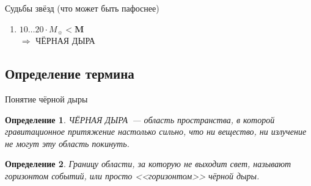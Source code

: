 \documentclass[usenames,dvipsnames,pdftex,unicode,hidelinks]{beamer}
\newtheorem{ru-def}{Определение}
\renewenvironment{definition}{\begin{ru-def}}{\end{ru-def}}
\begin{document}
\begin{frame}{Судьбы звёзд \small (что может быть пафоснее)}
\begin{enumerate}
\begin{center}
        \end{center}
      \item<3-> $10 \dots 20 \cdot M_{\sun} < \boldsymbol{M} $\\
        $\Rightarrow$ ЧЁРНАЯ ДЫРА
        \begin{center}
        \end{center}
    \end{enumerate}
  \end{frame}

  \subsection{Определение термина}

  \begin{frame}{Понятие чёрной дыры}
    \begin{definition}
      \alert{ЧЁРНАЯ ДЫРА}~--- область пространства, в которой гравитационное притяжение настолько
      сильно, что ни вещество, ни излучение не могут эту область покинуть.
    \end{definition}

    \begin{center}
    \end{center}

    \begin{definition}
      Границу области, за которую не выходит свет, называют \alert{горизонтом событий}, или
      просто <<горизонтом>> чёрной дыры.
    \end{definition}
  \end{frame}
\end{document}
